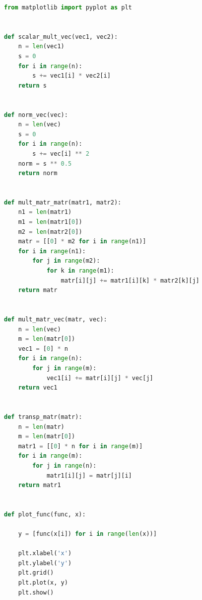 \documentclass[a4paper, 14pt]{extarticle}
\begin{document}
\begin{lstlisting}[language={python},caption={Методы для выполнения операций с матрицами и векторами},label={lst:code1}]
from matplotlib import pyplot as plt


def scalar_mult_vec(vec1, vec2):
    n = len(vec1)
    s = 0
    for i in range(n):
        s += vec1[i] * vec2[i]
    return s


def norm_vec(vec):
    n = len(vec)
    s = 0
    for i in range(n):
        s += vec[i] ** 2
    norm = s ** 0.5
    return norm


def mult_matr_matr(matr1, matr2):
    n1 = len(matr1)
    m1 = len(matr1[0])
    m2 = len(matr2[0])
    matr = [[0] * m2 for i in range(n1)]
    for i in range(n1):
        for j in range(m2):
            for k in range(m1):
                matr[i][j] += matr1[i][k] * matr2[k][j]
    return matr


def mult_matr_vec(matr, vec):
    n = len(vec)
    m = len(matr[0])
    vec1 = [0] * n
    for i in range(n):
        for j in range(m):
            vec1[i] += matr[i][j] * vec[j]
    return vec1


def transp_matr(matr):
    n = len(matr)
    m = len(matr[0])
    matr1 = [[0] * n for i in range(m)]
    for i in range(m):
        for j in range(n):
            matr1[i][j] = matr[j][i]
    return matr1


def plot_func(func, x):

    y = [func(x[i]) for i in range(len(x))]

    plt.xlabel('x')
    plt.ylabel('y')
    plt.grid()
    plt.plot(x, y)
    plt.show()

\end{lstlisting}
\end{document}
